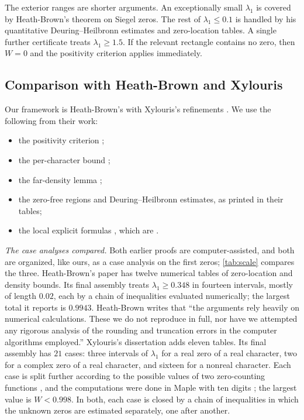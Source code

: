 \documentclass[11pt]{amsart}
\numberwithin{equation}{section}
\theoremstyle{plain}
\theoremstyle{definition}
\theoremstyle{remark}
\newcommand{\1}{\mathbf{1}}
\begin{document}
The exterior ranges are shorter arguments. An exceptionally small $\lambda_1$ is covered
by Heath-Brown's theorem on Siegel zeros. The rest of $\lambda_1\le0.1$ is handled by his
quantitative Deuring--Heilbronn estimates and zero-location tables. A single further
certificate treats $\lambda_1\ge1.5$. If the relevant rectangle contains no zero, then
$W=0$ and the positivity criterion applies immediately.

\subsection{Comparison with Heath-Brown and Xylouris}\label{subsec:compare}

Our framework is Heath-Brown's \cite{HeathBrown1992zero} with Xylouris's refinements
\cite{Xylouris2011nullstellen,Xylouris2018linnik}. We use the following from their work:
\begin{itemize}
  \item the positivity criterion \cite[(3.57)]{Xylouris2011nullstellen};
  \item the per-character bound \cite[Lemma~3.10]{Xylouris2011nullstellen};
  \item the far-density lemma \cite[Lemma~5.1]{Xylouris2011nullstellen};
  \item the zero-free regions and Deuring--Heilbronn estimates, as printed in their tables;
  \item the local explicit formulas \cite[Lemmas~3.1, 3.2]{Xylouris2011nullstellen}, which are
    \cite[Lemmas~5.3, 5.2]{HeathBrown1992zero}.
\end{itemize}

\emph{The case analyses compared.} Both earlier proofs are computer-assisted, and both are
organized, like ours, as a case analysis on the first zeros; \cref{tab:scale} compares the three.
Heath-Brown's paper has twelve numerical tables of zero-location and density bounds. Its final
assembly \cite[\S15]{HeathBrown1992zero} treats $\lambda_1\ge0.348$ in fourteen intervals, mostly of length
$0.02$, each by a chain of inequalities evaluated numerically; the largest total it reports is
$0.9943$. Heath-Brown writes \cite[\S1]{HeathBrown1992zero} that ``the arguments rely heavily on
numerical calculations. These we do not reproduce in full, nor have we attempted any rigorous
analysis of the rounding and truncation errors in the computer algorithms employed.'' Xylouris's
dissertation adds eleven tables. Its final assembly \cite[\S6.4, pp.~86--87]{Xylouris2011nullstellen}
has $21$ cases: three intervals of $\lambda_1$ for a real zero of a real character, two for a complex
zero of a real character, and sixteen for a nonreal character. Each case is split further
according to the possible values of two zero-counting functions
\cite[(6.46)]{Xylouris2011nullstellen}, and the computations were done in Maple with ten digits
\cite[p.~14]{Xylouris2011nullstellen}; the largest value is $W<0.998$. In both, each case is closed by a
chain of inequalities in which the unknown zeros are estimated separately, one after another.
\end{document}
